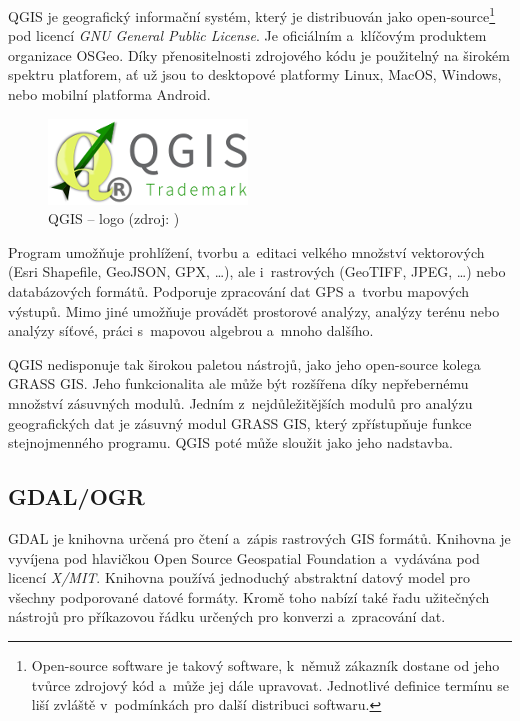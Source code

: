 \documentclass[12pt]{article}
\begin{document}
QGIS je geografický informační systém, který je distribuován jako open-source\footnote{Open-source software je takový software, k~němuž zákazník dostane od jeho tvůrce zdrojový kód a~může jej dále upravovat. Jednotlivé definice termínu  se liší zvláště v~podmínkách pro další distribuci softwaru.\cite{abclinuxu_opensource}} pod licencí \textit{GNU General Public License}. Je oficiálním a~klíčovým produktem organizace OSGeo. Díky přenositelnosti zdrojového kódu je použitelný na širokém spektru platforem, ať už jsou to desktopové platformy Linux, MacOS, Windows, nebo mobilní platforma Android.

\begin{figure}[htb]
\centering
\includegraphics[scale=1]{images/qgis-logo.png}
\caption[QGIS -- logo]{QGIS -- logo (zdroj: \cite{qgis})}
\end{figure}

Program umožňuje prohlížení, tvorbu a~editaci velkého množství vektorových (Esri Shapefile, GeoJSON, GPX, \dots), ale i~rastrových (GeoTIFF, JPEG, \dots) nebo databázových formátů. Podporuje zpracování dat GPS a~tvorbu mapových výstupů. Mimo jiné umožňuje provádět prostorové analýzy, analýzy terénu nebo analýzy síťové, práci s~mapovou algebrou a~mnoho dalšího.

QGIS nedisponuje tak širokou paletou nástrojů, jako jeho open-source kolega GRASS GIS. Jeho funkcionalita ale může být rozšířena díky nepřebernému množství zásuvných modulů. Jedním z~nejdůležitějších modulů pro analýzu geografických dat je zásuvný modul GRASS GIS, který zpřístupňuje funkce stejnojmenného programu. QGIS poté může sloužit jako jeho nadstavba.
\cite{qgis}
\cite{qgis_wiki}


\subsection{GDAL/OGR}

GDAL je knihovna určená pro čtení a~zápis rastrových GIS formátů. Knihovna je vyvíjena pod hlavičkou Open Source Geospatial Foundation a~vydávána pod licencí \textit{X/MIT}. Knihovna používá jednoduchý abstraktní datový model pro všechny podporované datové formáty. Kromě toho nabízí také řadu užitečných nástrojů pro příkazovou řádku určených pro konverzi a~zpracování dat. \cite{gdal_wiki}
\end{document}
